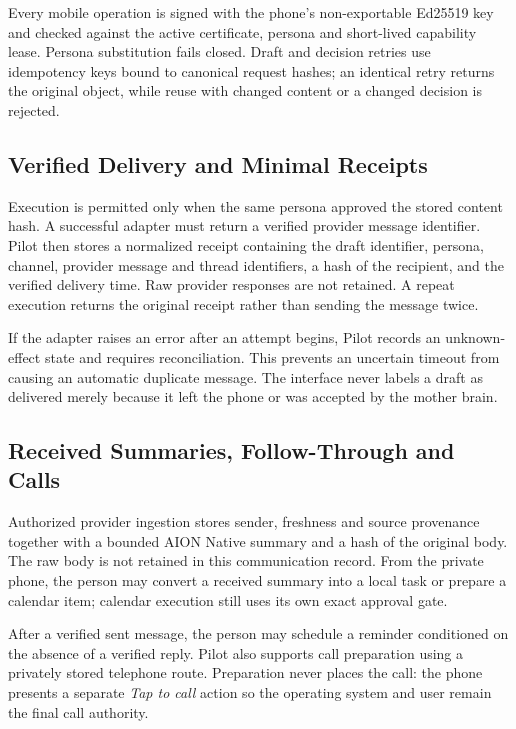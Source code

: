 Every mobile operation is signed with the phone's non-exportable Ed25519 key and checked against
the active certificate, persona and short-lived capability lease.  Persona substitution fails
closed.  Draft and decision retries use idempotency keys bound to canonical request hashes; an
identical retry returns the original object, while reuse with changed content or a changed decision
is rejected.

\subsection{Verified Delivery and Minimal Receipts}

Execution is permitted only when the same persona approved the stored content hash.  A successful
adapter must return a verified provider message identifier.  Pilot then stores a normalized receipt
containing the draft identifier, persona, channel, provider message and thread identifiers, a hash
of the recipient, and the verified delivery time.  Raw provider responses are not retained.  A
repeat execution returns the original receipt rather than sending the message twice.

If the adapter raises an error after an attempt begins, Pilot records an unknown-effect state and
requires reconciliation.  This prevents an uncertain timeout from causing an automatic duplicate
message.  The interface never labels a draft as delivered merely because it left the phone or was
accepted by the mother brain.

\subsection{Received Summaries, Follow-Through and Calls}

Authorized provider ingestion stores sender, freshness and source provenance together with a
bounded AION Native summary and a hash of the original body.  The raw body is not retained in this
communication record.  From the private phone, the person may convert a received summary into a
local task or prepare a calendar item; calendar execution still uses its own exact approval gate.

After a verified sent message, the person may schedule a reminder conditioned on the absence of a
verified reply.  Pilot also supports call preparation using a privately stored telephone route.
Preparation never places the call: the phone presents a separate \emph{Tap to call} action so the
operating system and user remain the final call authority.

